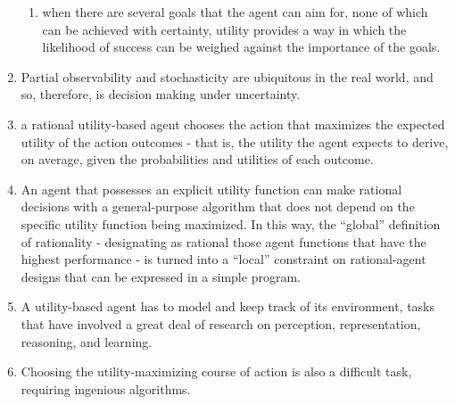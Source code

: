 \begin{enumerate}[itemsep=0.2cm]
\begin{enumerate}
        \item when there are several goals that the agent can aim for, none of which can be achieved with certainty, utility provides a way in which the likelihood of success can be weighed against the importance of the goals.
        \hfill \cite{ai/book/Artificial-Intelligence-A-Modern-Approach/Russell-Norvig}
    \end{enumerate}

    \item Partial observability and stochasticity are ubiquitous in the real world, and so, therefore, is decision making under uncertainty. 
    \hfill \cite{ai/book/Artificial-Intelligence-A-Modern-Approach/Russell-Norvig}

    \item a rational utility-based agent chooses the action that maximizes the expected utility of the action outcomes - that is, the utility the agent expects to derive, on average, given the probabilities and utilities of each outcome.
    \hfill \cite{ai/book/Artificial-Intelligence-A-Modern-Approach/Russell-Norvig}

    \item An agent that possesses an explicit utility function can make rational decisions with a general-purpose algorithm that does not depend on the specific utility function being maximized. In this way, the “global” definition of rationality - designating as rational those agent functions that have the highest performance - is turned into a “local” constraint on rational-agent designs that can be expressed in a simple program.
    \hfill \cite{ai/book/Artificial-Intelligence-A-Modern-Approach/Russell-Norvig}

    \item A utility-based agent has to model and keep track of its environment, tasks that have involved a great deal of research on perception, representation, reasoning, and learning.
    \hfill \cite{ai/book/Artificial-Intelligence-A-Modern-Approach/Russell-Norvig}

    \item Choosing the utility-maximizing course of action is also a difficult task, requiring ingenious algorithms.
    \hfill \cite{ai/book/Artificial-Intelligence-A-Modern-Approach/Russell-Norvig}
\end{enumerate}



\vspace{0.5cm}



